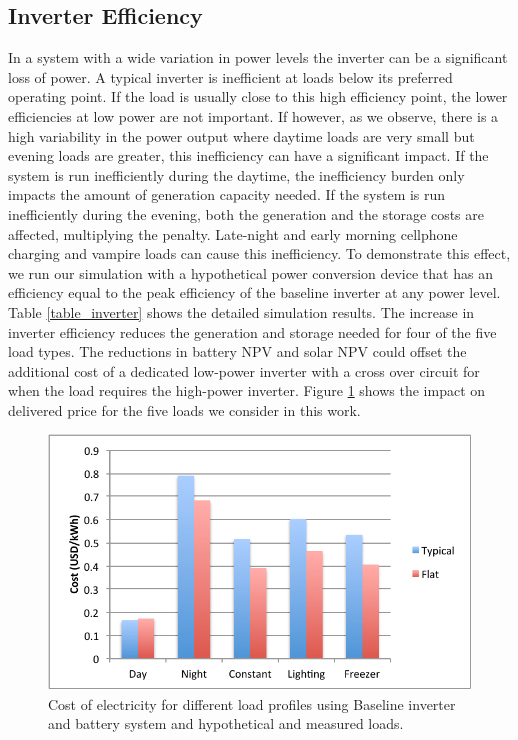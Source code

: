 \documentclass[conference]{IEEEtran}
\begin{document}
\subsection{Inverter Efficiency}

In a system with a wide variation in power levels the inverter can
be a significant loss of power.
A typical inverter is inefficient at loads below its
preferred operating point.
If the load is usually close to this high efficiency
point, the lower efficiencies at low power are not important.
If however, as we observe, there is a high variability
in the power output where daytime loads are very small
but evening loads are greater, this inefficiency can have
a significant impact.
If the system is run inefficiently during the daytime, the inefficiency
burden only impacts the amount of generation capacity needed.
If the system is run inefficiently during the evening, both the
generation and the storage costs are affected, multiplying the
penalty.
Late-night and early morning cellphone charging and vampire
loads can cause this inefficiency.
To demonstrate this effect, we run our simulation with
a hypothetical power conversion device that has an
efficiency equal to the peak efficiency of the baseline
inverter at any power level.
Table \ref{table_inverter} shows the detailed simulation
results.
The increase in inverter efficiency reduces the generation
and storage needed for four of the five load types.
The reductions in battery NPV and solar NPV could offset the
additional cost of a dedicated low-power inverter with a cross
over circuit for when the load requires the high-power inverter.
Figure \ref{fig_inverter}
shows the impact on delivered price for the five loads we
consider in this work.

\begin{figure}[]
\begin{center}
\includegraphics[width=\columnwidth]{figures/inverter.pdf}
\end{center}
\caption{Cost of electricity for different load profiles using Baseline 
inverter and battery system and hypothetical and measured loads.}
\label{fig_inverter}
\end{figure}
\end{document}
